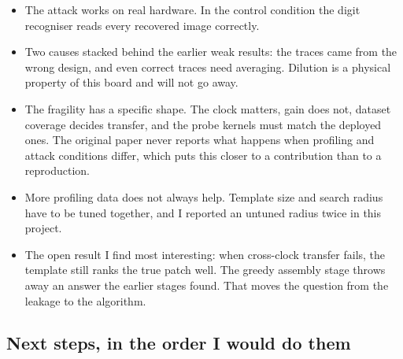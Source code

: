 \documentclass[11pt,a4paper]{article}
\begin{document}
\begin{itemize}
\item The attack works on real hardware. In the control condition the digit recogniser
      reads every recovered image correctly.
\item Two causes stacked behind the earlier weak results: the traces came from the wrong
      design, and even correct traces need averaging. Dilution is a physical property of
      this board and will not go away.
\item The fragility has a specific shape. The clock matters, gain does not, dataset
      coverage decides transfer, and the probe kernels must match the deployed ones. The
      original paper never reports what happens when profiling and attack conditions
      differ, which puts this closer to a contribution than to a reproduction.
\item More profiling data does not always help. Template size and search radius have to be
      tuned together, and I reported an untuned radius twice in this project.
\item The open result I find most interesting: when cross-clock transfer fails, the
      template still ranks the true patch well. The greedy assembly stage throws away an
      answer the earlier stages found. That moves the question from the leakage to the
      algorithm.
\end{itemize}

\subsection*{Next steps, in the order I would do them}
\end{document}
